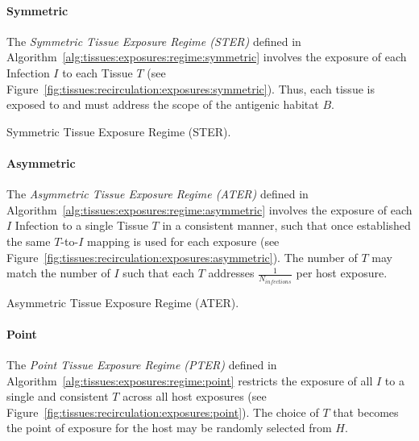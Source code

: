 %
%
\paragraph{Symmetric}
The \emph{Symmetric Tissue Exposure Regime (STER)} defined in Algorithm~\ref{alg:tissues:exposures:regime:symmetric} involves the exposure of each Infection $I$ to each Tissue $T$ (see Figure~\ref{fig:tissues:recirculation:exposures:symmetric}). Thus, each tissue is exposed to and must address the scope of the antigenic habitat $B$. 

\begin{algorithm}[ht]	
	\SetLine		
	
	\KwIn{\Host, \Habitat}
	
	{
		{
			\;
		}
	}	
	\caption{Symmetric Tissue Exposure Regime (STER).}
	\label{alg:tissues:exposures:regime:symmetric}
\end{algorithm}

%
%
\paragraph{Asymmetric}
The \emph{Asymmetric Tissue Exposure Regime (ATER)} defined in Algorithm~\ref{alg:tissues:exposures:regime:asymmetric} involves the exposure of each $I$ Infection to a single Tissue $T$ in a consistent manner, such that once established the same $T$-to-$I$ mapping is used for each exposure (see Figure~\ref{fig:tissues:recirculation:exposures:asymmetric}). The number of $T$ may match the number of $I$ such that each $T$ addresses $\frac{1}{N_{infections}}$ per host exposure.

\begin{algorithm}[ht]	
	\SetLine		
	\KwIn{\Host, \Habitat}
	
	{
		\;
	}	
	\caption{Asymmetric Tissue Exposure Regime (ATER).}
	\label{alg:tissues:exposures:regime:asymmetric}
\end{algorithm}


%
%
\paragraph{Point}
The \emph{Point Tissue Exposure Regime (PTER)} defined in Algorithm~\ref{alg:tissues:exposures:regime:point} restricts the exposure of all $I$ to a single and consistent $T$ across all host exposures (see Figure~\ref{fig:tissues:recirculation:exposures:point}). The choice of $T$ that becomes the point of exposure for the host may be randomly selected from $H$.

